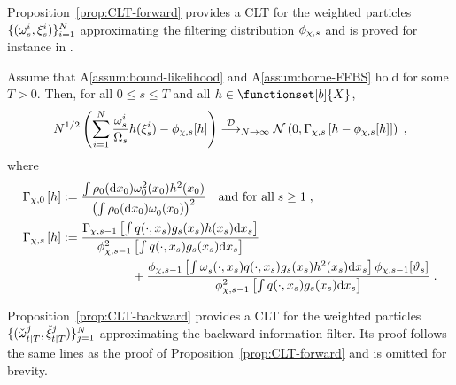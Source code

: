 Proposition~\ref{prop:CLT-forward} provides a CLT for the weighted particles $\{  (\omega_{s}^{i},\xi_{s}^{i})\}_{i=1}^N$ approximating the filtering distribution $\filt{\Xinit,s}$ and is proved for instance in \cite{delmoral:2004}.
\begin{prop}
\label{prop:CLT-forward}
Assume that A\ref{assum:bound-likelihood} and A\ref{assum:borne-FFBS} hold for some $T > 0$. Then, for all $0\le s\le T$ and all $h \in \functionset[b]{X}$,
\[
N^{1/2} \left(\sum_{i=1}^N \frac{\ewght{s}{i}}{\sumwght{s}} h(\epart{s}{i}) - \filt{\Xinit,s}[h]\right) \dlim_{N \to \infty} \mathcal{N}\left(0,\asymVar[\Xinit]{s}{h - \filt{\Xinit,s}[h]}\right)\eqsp,
\]
where 
\begin{align*}
\asymVar[\Xinit]{0}{h} &\eqdef \frac{ \int \XinitIS{0}(\rmd x_0)\ewght{0}{2}(x_0)h^2(x_0)}{\left(\int \XinitIS{0}(\rmd x_0)\ewght{0}{}(x_0)\right)^{2}}\quad\mbox{and for all\;} s\ge 1\eqsp,\\
\asymVar[\Xinit]{s}{h} &\eqdef \frac{\asymVar[\Xinit]{s-1}{\int q(\cdot,x_{s})g_s(x_s)h(x_s)\rmd x_s}}{\filt{\chi,s-1}^2\left[\int q(\cdot,x_s)g_s(x_s)\rmd x_s\right]}\\
&\hspace{2cm}+\frac{\filt{\Xinit,s-1}\left[\int \ewght{s}{}(\cdot,x_s)q(\cdot,x_s)g_s(x_s)h^2(x_s)\rmd x_s\right]\filt{\chi,s-1}[\adjfuncforward{s}]}{\filt{\chi,s-1}^2\left[\int q(\cdot,x_s)g_s(x_s)\rmd x_s\right]}\eqsp.
\end{align*}
\end{prop}
Proposition~\ref{prop:CLT-backward} provides a CLT for the weighted particles $\{  ({\check{\omega}}_{t|T}^{j},{\check{\xi}}_{t|T}^{j})\}_{j=1}^N$ approximating the backward information filter. Its proof follows the same lines as the proof of Proposition~\ref{prop:CLT-forward} and is omitted for brevity.
